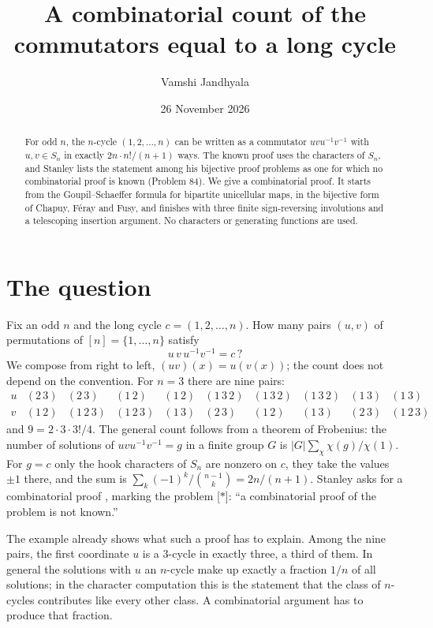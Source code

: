 \documentclass[11pt]{amsart}
\title{A combinatorial count of the commutators equal to a long cycle}
\author{Vamshi Jandhyala}
\date{26 November 2026}
\theoremstyle{remark}
\begin{document}
\begin{abstract}
For odd $n$, the $n$-cycle $(1,2,\dots,n)$ can be written as a commutator $uvu^{-1}v^{-1}$ with $u,v\in S_n$ in
exactly $2n\cdot n!/(n+1)$ ways. The known proof uses the characters of $S_n$, and Stanley lists the statement among
his bijective proof problems as one for which no combinatorial proof is known (Problem 84). We give a combinatorial
proof. It starts from the Goupil--Schaeffer formula for bipartite unicellular maps, in the bijective form of Chapuy,
F\'eray and Fusy, and finishes with three finite sign-reversing involutions and a telescoping insertion argument. No
characters or generating functions are used.
\end{abstract}
\maketitle

\section{The question}

Fix an odd $n$ and the long cycle $c=(1,2,\dots,n)$. How many pairs $(u,v)$ of permutations of $[n]=\{1,\dots,n\}$
satisfy
\[
  u\,v\,u^{-1}v^{-1}=c\,?
\]
We compose from right to left, $(uv)(x)=u(v(x))$; the count does not depend on the convention. For $n=3$ there are
nine pairs:
\[
\begin{array}{c|ccccccccc}
u & (2\,3) & (2\,3) & (1\,2) & (1\,2) & (1\,3\,2) & (1\,3\,2) & (1\,3\,2) & (1\,3) & (1\,3)\\
v & (1\,2) & (1\,2\,3) & (1\,2\,3) & (1\,3) & (2\,3) & (1\,2) & (1\,3) & (2\,3) & (1\,2\,3)
\end{array}
\]
and $9=2\cdot 3\cdot 3!/4$. The general count follows from a theorem of Frobenius: the number of solutions of
$uvu^{-1}v^{-1}=g$ in a finite group $G$ is $|G|\sum_\chi \chi(g)/\chi(1)$. For $g=c$ only the hook characters of $S_n$
are nonzero on $c$, they take the values $\pm1$ there, and the sum is $\sum_k(-1)^k/\binom{n-1}{k}=2n/(n+1)$.
Stanley asks for a combinatorial proof \cite[Problem~84]{Bij}, marking the problem [$*$]:
``a combinatorial proof of the problem is not known.''

The example already shows what such a proof has to explain. Among the nine pairs, the first coordinate $u$ is a
$3$-cycle in exactly three, a third of them. In general the solutions with $u$ an $n$-cycle make up exactly a
fraction $1/n$ of all solutions; in the character computation this is the statement that the class of $n$-cycles
contributes like every other class. A combinatorial argument has to produce that fraction.
\end{document}
